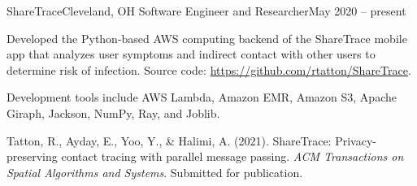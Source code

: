 \begin{ritemize}
{ShareTrace}{Cleveland, OH}
{Software Engineer and Researcher}{May 2020 -- present}
	\item Developed the Python-based AWS computing backend of the ShareTrace mobile app that analyzes user symptoms and indirect contact with other users to determine risk of infection. Source code: \url{https://github.com/rtatton/ShareTrace}.
	\item Development tools include AWS Lambda, Amazon EMR, Amazon S3, Apache Giraph, Jackson, NumPy, Ray, and Joblib.
	\item Tatton, R., Ayday, E., Yoo, Y., \& Halimi, A. (2021). ShareTrace: Privacy-preserving contact tracing with parallel message passing. \textit{ACM Transactions on Spatial Algorithms and Systems}. Submitted for publication.
\end{ritemize}